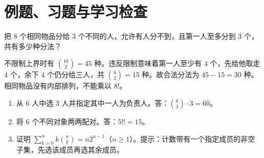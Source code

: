 \section{例题、习题与学习检查}
\begin{example}
把 $8$ 个相同物品分给 $3$ 个不同的人，允许有人分不到，且第一人至多分到 $3$ 个，共有多少种分法？
\end{example}
\begin{solve}
不限制上界时有 $\binom{10}2=45$ 种。违反限制意味着第一人至少有 $4$ 个，先给他取走 $4$ 个，余下 $4$ 个仍分给三人，共 $\binom62=15$ 种。故合法分法为 $45-15=30$ 种。相同物品没有内部排列，不能乘以 $8!$。
\end{solve}
\begin{enumerate}
\item 从 $6$ 人中选 $3$ 人并指定其中一人为负责人。答：$\binom63\cdot3=60$。
\item 将 $6$ 个不同对象两两配对。答：$5!!=15$。
\item 证明 $\sum_{k=0}^n k\binom nk=n2^{n-1}$（$n\ge1$）。提示：计数带有一个指定成员的非空子集，先选该成员再选其余成员。
\end{enumerate}

